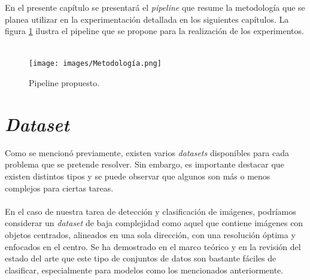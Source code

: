En el presente capítulo se presentará el \textit{pipeline} que resume la metodología que se planea utilizar en la experimentación detallada en los siguientes capítulos. La figura \ref{pipeline} ilustra el pipeline que se propone para la realización de los experimentos.  \\\\

\begin{figure}[h!]
\texttt{[image: images/Metodología.png]}
\centering
\caption{Pipeline propuesto.  }
\label{pipeline}
\end{figure}

\section{\textit{Dataset}}

Como se mencionó previamente, existen varios \textit{datasets} disponibles para cada problema que se pretende resolver. Sin embargo, es importante destacar que existen distintos tipos y se puede observar que algunos son más o menos complejos para ciertas tareas. 
\\\\
En el caso de nuestra tarea de detección y clasificación de imágenes, podríamos considerar un \textit{dataset} de baja complejidad como aquel que contiene imágenes con objetos centrados, alineados en una sola dirección, con una resolución óptima y enfocados en el centro. Se ha demostrado en el marco teórico y en la revisión del estado del arte que este tipo de conjuntos de datos son bastante fáciles de clasificar, especialmente para modelos como los mencionados anteriormente.
\\\\

